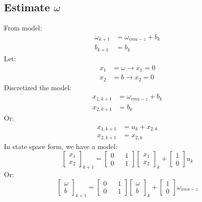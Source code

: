 \documentclass[12pt,a4paper]{article}
\begin{document}
	\subsection{Estimate \(\omega\)}
	From model:
	\begin{equation}
		\begin{split}
			\omega_{k+1} &= \omega_{imu-z} + b_k \\
			b_{k+1} &= b_k
		\end{split}
		\label{eq12}
	\end{equation}
	Let:
	\[\begin{split}
		x_1 &= \omega \rightarrow \dot{x_1} = 0 \\
		x_2 &= b \rightarrow \dot{x_2} = 0
	\end{split}\]
	Discretized the model:
	\[\begin{split}
		x_{1,k+1} &= \omega_{imu-z} + b_k \\
		x_{2,k+1} &= b_k
	\end{split}\]
	Or:
	\[\begin{split}
		x_{1,k+1} &= u_k + x_{2,k} \\
		x_{2,k+1} &= x_{2,k}
	\end{split}\]
	In state space form, we have a model:
	\begin{equation}
		\boxed{
			\begin{bmatrix}
				x_1 \\
				x_2 
			\end{bmatrix}_{k+1} = 
			\begin{bmatrix}
				0 &   & 1 \\
				0 &   & 1 
			\end{bmatrix}
			\begin{bmatrix}
				x_1 \\
				x_2 
			\end{bmatrix}_k +
			\begin{bmatrix}
				1 \\
				0 
			\end{bmatrix} u_k
		}
		\label{eq13}
	\end{equation}
	Or:
	\begin{equation}
		\boxed{
			\begin{bmatrix}
				\omega \\
				b      
			\end{bmatrix}_{k+1} = 
			\begin{bmatrix}
				0 &   & 1 \\
				0 &   & 1 
			\end{bmatrix}
			\begin{bmatrix}
				\omega \\
				b      
			\end{bmatrix}_k +
			\begin{bmatrix}
				1 \\
				0 
			\end{bmatrix} \omega_{imu-z}
		}
		\label{eq14}
	\end{equation}
\end{document}
